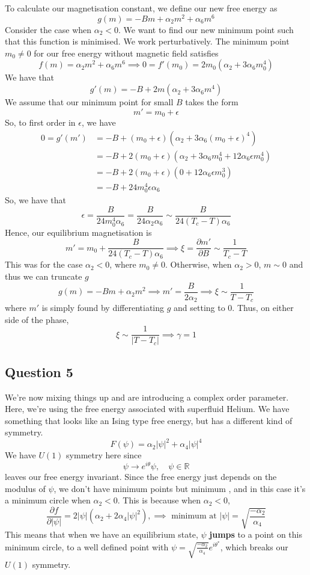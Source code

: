 \documentclass[11pt, oneside]{article}   	%
\begin{document}
To calculate our magnetisation constant, we define our new free energy as 
\[
g ( m )   = - Bm + \alpha_2 m^ 2 + \alpha_6 m ^ 6 
\] Consider the case when $\alpha_2 < 0 $.  We want to find our new minimum point such that this function is minimised. 
We work perturbatively. The minimum point $ m_0  \neq 0 $ for our free energy 
without magnetic field satisfies 
\[
f ( m )  = \alpha_2 m ^ 2  +\alpha_6 m ^ 6 \implies 0  = f' ( m_0 ) =  2m_0 ( \alpha_2 + 3 \alpha_6 m_0 ^ 4 ) 
\] We have that 
\[
g '( m ) = - B + 2m ( \alpha_2 + 3 \alpha_6 m ^ 4 ) 
\] We assume that our minimum point for small $B $ takes the form 
\[
m' = m_0 + \epsilon 
\] So, to first order in $ \epsilon$, we have 
\begin{align*}
 0 = g' ( m' ) &=  - B + ( m_0 + \epsilon) ( \alpha_2 + 3 \alpha_6 ( m_0 + \epsilon) ^ 4 ) \\
	       & = - B + 2 ( m_0 + \epsilon)( \alpha_2 + 3 \alpha_6 m_0^ 4 + 12 \alpha_6 \epsilon m_0^ 4) \\
	       &= - B + 2 ( m_0 + \epsilon) ( 0 + 12 \alpha_6 \epsilon m_0^3 ) \\
	       &= - B + 24 m_0^4 \epsilon \alpha_6 
	  \end{align*}
So, we have that 
\[
	\epsilon = \frac{B }{ 24 m_0^4 \alpha_6 } = \frac{B }{ 24 \alpha_2 \alpha_6} \sim \frac{B }{ 24 ( T_c - T )  \alpha_6} 
\] Hence, our equilibrium magnetisation is
\[
 m ' = m_0 +  \frac{B }{ 24 ( T_c - T )  \alpha_6} \implies  \xi =\frac{\partial m' }{\partial B } \sim \frac{1}{T_c - T }
\] This was for the case $ \alpha_2 < 0 $, where $ m_0 \neq 0 $. 
Otherwise, when $\alpha_2 > 0 $, $m \sim 0 $ and thus we can truncate $ g $
 \[
 g ( m) = - B m + \alpha_2 m^2 \implies m' = \frac{B}{2 \alpha_2 } \implies \xi  \sim \frac{1}{ T - T_c}
\] where $ m' $ is simply found by differentiating $g $ and setting to 0. 
Thus, on either side of the phase, 
\[
\xi \sim \frac{1}{ | T - T_c | } \implies \gamma = 1
\] 


\pagebreak 
\subsection{Question 5} 
We're now mixing things up and are introducing a complex order parameter. Here, we're using the free energy associated with superfluid Helium. We have something that looks like an Ising type free energy, but has a different kind of symmetry. 
\[ 
	F(\psi) = \alpha_2 |\psi|^2 + \alpha_4 |\psi|^4 
\] We have $U ( 1) $ symmetry here since 
\[ 
	\psi \rightarrow e^{ i \theta} \psi, \quad \psi \in \mathbb{R} 
\] leaves our free energy invariant. Since the free energy just depends on the modulus of $\psi$, we don't have minimum points but minimum , and in this case it's a minimum circle when $\alpha_2 < 0$. This is because when $\alpha_2 < 0 $, 
\[ 
	\frac{ \partial f }{ \partial |\psi| } = 2 |\psi|( \alpha_2 + 2 \alpha_4 | \psi|^2 ) , \implies \text{ minimum at } |\psi|  = \sqrt{ \frac{  - \alpha_2}{ \alpha_4 }} 
\] This means that when we have an equilibrium state, $\psi$ \textbf{jumps} to a point on this minimum circle, to a well defined point with $ \psi = \sqrt{ \frac{  - \alpha_2 }{ \alpha_4 } } e^{i \theta^*} $, which breaks our $U ( 1)$ symmetry. 
\end{document}

